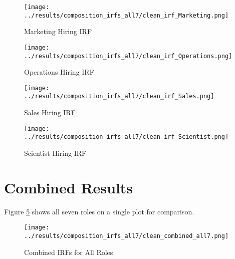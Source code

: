 \documentclass[11pt]{article}
\begin{document}
\begin{figure}[H]
\centering
\texttt{[image: ../results/composition\_irfs\_all7/clean\_irf\_Marketing.png]}
\caption{Marketing Hiring IRF}
\label{fig:marketing}
\end{figure}

\begin{figure}[H]
\centering
\texttt{[image: ../results/composition\_irfs\_all7/clean\_irf\_Operations.png]}
\caption{Operations Hiring IRF}
\label{fig:operations}
\end{figure}

\begin{figure}[H]
\centering
\texttt{[image: ../results/composition\_irfs\_all7/clean\_irf\_Sales.png]}
\caption{Sales Hiring IRF}
\label{fig:sales}
\end{figure}

\begin{figure}[H]
\centering
\texttt{[image: ../results/composition\_irfs\_all7/clean\_irf\_Scientist.png]}
\caption{Scientist Hiring IRF}
\label{fig:scientist}
\end{figure}

\section{Combined Results}

Figure \ref{fig:combined} shows all seven roles on a single plot for comparison.

\begin{figure}[H]
\centering
\texttt{[image: ../results/composition\_irfs\_all7/clean\_combined\_all7.png]}
\caption{Combined IRFs for All Roles}
\label{fig:combined}
\end{figure}
\end{document}

